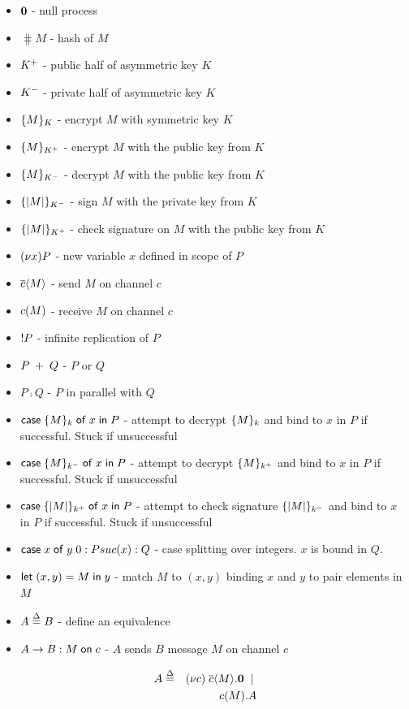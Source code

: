 \documentclass[10pt]{article}
\newcommand{\squash}{\parskip=0pt\itemsep=0pt}
\begin{document}
\begin{itemize}
  \squash
\item $\mathbf{0}$ - null process
\item $\hash{M}$ - hash of $M$
\item $K^{+}$ - public half of asymmetric key $K$
\item $K^{-}$ - private half of asymmetric key $K$
\item $\{M\}_{K}$ - encrypt $M$ with symmetric key $K$
\item $\{M\}_{K^{+}}$ - encrypt $M$ with the public key from $K$
\item $\{M\}_{K^{-}}$ - decrypt $M$ with the public key from $K$
\item $\{|M|\}_{K^{-}}$ - sign $M$ with the private key from $K$
\item $\{|M|\}_{K^{+}}$ - check signature on $M$ with the public key from $K$
\item $(\nu x)P$ - new variable $x$ defined in scope of $P$
\item $\overline{c}\langle M\rangle$ - send $M$ on channel $c$
\item $c(M)$ - receive $M$ on channel $c$
\item $!P$ - infinite replication of $P$
\item $P\; + \; Q$ - $P$ or $Q$
\item $P\comp Q$ - $P$ in parallel with $Q$
\item $\mathsf{case}\; \{M\}_{k}\; \mathsf{of}\; x\; \mathsf{in}\; P$ - attempt to decrypt $\{M\}_{k}$ and
  bind to $x$ in $P$ if successful.  Stuck if unsuccessful
\item $\mathsf{case}\; \{M\}_{k^{-}}\; \mathsf{of}\; x\; \mathsf{in}\; P$ - attempt to decrypt $\{M\}_{k^{+}}$ and
  bind to $x$ in $P$ if successful.  Stuck if unsuccessful
\item $\mathsf{case}\; \{|M|\}_{k^{+}}\; \mathsf{of}\; x\; \mathsf{in}\; P$ - attempt to check signature $\{|M|\}_{k^{-}}$ and
  bind to $x$ in $P$ if successful.  Stuck if unsuccessful
\item $\mathsf{case}\; x\; \mathsf{of}\; y\;  0: P suc(x): Q$ - case splitting over integers.
  $x$ is bound in $Q$.
\item $\mathsf{let}\; (x,y)=M\; \mathsf{in}\; y $ - match $M$ to $(x,y)$ binding $x$ and $y$
  to pair elements in $M$
\item $A\stackrel{\Delta}{=} B$ - define an equivalence
\item $A\rightarrow B:M\; \mathsf{on}\; c$ - $A$ sends $B$ message $M$ on channel $c$
\end{itemize}

\begin{eqnarray*}
  \label{eq:1}
  A & \stackrel{\Delta}{=} & (\nu c)\;\overline{c}\langle M\rangle.\mathbf{0} \; \mid \; \\
    & & c(M).A
\end{eqnarray*}



\end{document}
